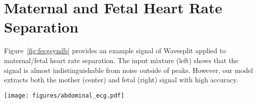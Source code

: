 \documentclass[letterpaper, onecolumn,10 pt]{IEEEtran}
\begin{document}
\section{Maternal and Fetal Heart Rate Separation}
\label{appendix:fecgsyndb}

Figure~\ref{fig:fecgsyndb} provides an example signal of Wavesplit applied to maternal/fetal heart rate separation. The input mixture (left)
shows that the signal is almost indistinguishable from noise outside of peaks. However, our model extracts both the mother (center)
and fetal (right) signal with high accuracy.

\begin{figure*}[h] 
  \begin{center}
  \texttt{[image: figures/abdominal\_ecg.pdf]}
  \end{center}
  \caption{Example of separation of maternal and foetal heart rate from a simulated abdominal electrode on the FECGSYNDB test set.}
  \label{fig:fecgsyndb}
 \end{figure*}
\end{document}
